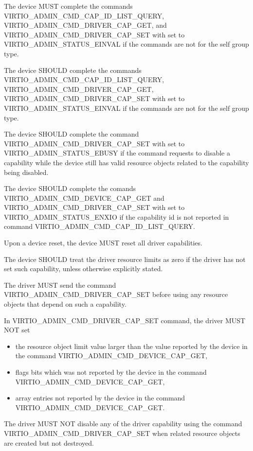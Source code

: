 The device MUST complete the commands VIRTIO_ADMIN_CMD_CAP_ID_LIST_QUERY,
VIRTIO_ADMIN_CMD_DRIVER_CAP_GET, and VIRTIO_ADMIN_CMD_DRIVER_CAP_SET
with  set to VIRTIO_ADMIN_STATUS_EINVAL if the commands are not
for the self group type.

The device SHOULD complete the commands VIRTIO_ADMIN_CMD_CAP_ID_LIST_QUERY,
VIRTIO_ADMIN_CMD_DRIVER_CAP_GET, VIRTIO_ADMIN_CMD_DRIVER_CAP_SET with
 set to VIRTIO_ADMIN_STATUS_EINVAL if the commands are not for the
self group type.

The device SHOULD complete the command VIRTIO_ADMIN_CMD_DRIVER_CAP_SET with
 set to VIRTIO_ADMIN_STATUS_EBUSY if the command requests to disable
a capability while the device still has valid resource objects related to the
capability being disabled.

The device SHOULD complete the comands VIRTIO_ADMIN_CMD_DEVICE_CAP_GET and
VIRTIO_ADMIN_CMD_DRIVER_CAP_SET with  set to
VIRTIO_ADMIN_STATUS_ENXIO if the capability id is not reported
in command VIRTIO_ADMIN_CMD_CAP_ID_LIST_QUERY.

Upon a device reset, the device MUST reset all driver capabilities.

The device SHOULD treat the driver resource limits as zero if the
driver has not set such capability, unless otherwise explicitly stated.


The driver MUST send the command VIRTIO_ADMIN_CMD_DRIVER_CAP_SET before
using any resource objects that depend on such a capability.

In VIRTIO_ADMIN_CMD_DRIVER_CAP_SET command, the driver MUST NOT set
\begin{itemize}
\item the resource object limit value larger than the value reported
by the device in the command VIRTIO_ADMIN_CMD_DEVICE_CAP_GET,
\item flags bits which was not reported by the device in the command
VIRTIO_ADMIN_CMD_DEVICE_CAP_GET,
\item array entries not reported by the device in the command
VIRTIO_ADMIN_CMD_DEVICE_CAP_GET.
\end{itemize}

The driver MUST NOT disable any of the driver capability using the command
VIRTIO_ADMIN_CMD_DRIVER_CAP_SET when related resource objects
are created but not destroyed.
